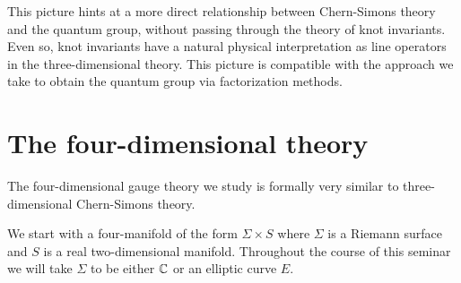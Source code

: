 \documentclass[10pt]{amsart}
\begin{document}
This picture hints at a more direct relationship between Chern-Simons theory and the quantum group, without passing through the theory of knot invariants. 
Even so, knot invariants have a natural physical interpretation as line operators in the three-dimensional theory. 
This picture is compatible with the approach we take to obtain the quantum group via factorization methods.

\section{The four-dimensional theory}

The four-dimensional gauge theory we study is formally very similar to three-dimensional Chern-Simons theory. 

We start with a four-manifold of the form $\Sigma \times S$ where $\Sigma$ is a Riemann surface and $S$ is a real two-dimensional manifold. 
Throughout the course of this seminar we will take $\Sigma$ to be either $\mathbb C$ or an elliptic curve $E$. 
\end{document}
